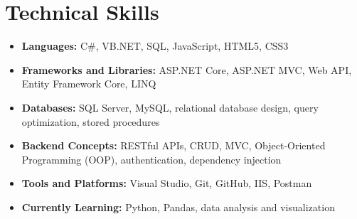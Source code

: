 \section*{Technical Skills}
\begin{itemize}
    \item \textbf{Languages:} C\#, VB.NET, SQL, JavaScript, HTML5, CSS3
    \item \textbf{Frameworks and Libraries:} ASP.NET Core, ASP.NET MVC, Web
          API, Entity Framework Core, LINQ
    \item \textbf{Databases:} SQL Server, MySQL, relational database design,
          query optimization, stored procedures
    \item \textbf{Backend Concepts:} RESTful APIs, CRUD, MVC, Object-Oriented
          Programming (OOP), authentication, dependency injection
    \item \textbf{Tools and Platforms:} Visual Studio, Git, GitHub, IIS,
          Postman
    \item \textbf{Currently Learning:} Python, Pandas, data analysis and
          visualization
\end{itemize}
